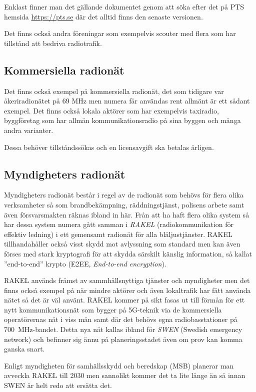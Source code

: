 Enklast finner man det gällande dokumentet genom att söka efter det på PTS
hemsida \url{https://pts.se} där det alltid finns den senaste versionen.

Det finns också andra föreningar som exempelvis scouter med flera som har
tillstånd att bedriva radiotrafik.

\subsection{Kommersiella radionät}

Det finns också exempel på kommersiella radionät, det som tidigare var
åkeriradionätet på 69 MHz men numera får användas rent allmänt är ett sådant
exempel. Det finns också lokala aktörer som har exempelvis taxiradio,
byggföretag som har allmän kommunikationsradio på sina byggen och många andra
varianter.

Dessa behöver tillståndssökas och en licensavgift ska betalas årligen.

\subsection{Myndigheters radionät}

Myndigheters radionät består i regel av de radionät som behövs för flera olika
verksamheter så som brandbekämpning, räddningstjänst, polisens arbete samt
även försvarsmakten räknas ibland in här. Från att ha haft flera olika system
så har dessa system numera gått samman i {\it RAKEL} (radiokommunikation för
effektiv ledning) i ett gemensamt radionät för alla blåljustjänster. RAKEL
tillhandahåller också visst skydd mot avlyssning som standard men kan även
förses med stark kryptografi för att skydda särskilt känslig information, så
kallat ''end-to-end'' krypto (E2EE, {\it End-to-end encryption}).

RAKEL används främst av sammhällsnyttiga tjänster och myndigheter men det
finns också exempel på när mindre aktörer och även lokaltrafik har fått
använda nätet så det är väl använt. RAKEL kommer på sikt fasas ut till förmån
för ett nytt kommunikationsnät som bygger på 5G-teknik via de kommersiella
operatörernas nät i viss mån samt där det behövs egna radiobasstationer på
700~MHz-bandet. Detta nya nät kallas ibland för {\it SWEN} (Swedish emergency
network) och befinner sig ännu på planeringsstadet även om prov kan komma
ganska snart.

Enligt myndigheten för samhällsskydd och beredskap (MSB) planerar man avveckla
RAKEL till 2030 men sannolikt kommer det ta lite länge än så innan SWEN är
helt redo att ersätta det.

